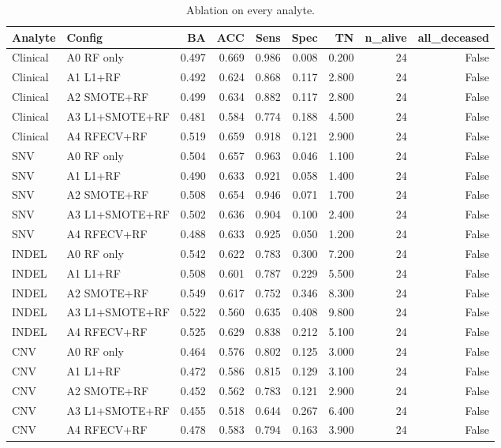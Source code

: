 \begin{table}[t]
\centering
\caption{Ablation on every analyte.}
\begin{tabular}{llrrrrrrr}
\hline
Analyte & Config & BA & ACC & Sens & Spec & TN & n\_alive & all\_deceased \\
\hline
Clinical & A0 RF only & 0.497 & 0.669 & 0.986 & 0.008 & 0.200 & 24 & False \\
Clinical & A1 L1+RF & 0.492 & 0.624 & 0.868 & 0.117 & 2.800 & 24 & False \\
Clinical & A2 SMOTE+RF & 0.499 & 0.634 & 0.882 & 0.117 & 2.800 & 24 & False \\
Clinical & A3 L1+SMOTE+RF & 0.481 & 0.584 & 0.774 & 0.188 & 4.500 & 24 & False \\
Clinical & A4 RFECV+RF & 0.519 & 0.659 & 0.918 & 0.121 & 2.900 & 24 & False \\
SNV & A0 RF only & 0.504 & 0.657 & 0.963 & 0.046 & 1.100 & 24 & False \\
SNV & A1 L1+RF & 0.490 & 0.633 & 0.921 & 0.058 & 1.400 & 24 & False \\
SNV & A2 SMOTE+RF & 0.508 & 0.654 & 0.946 & 0.071 & 1.700 & 24 & False \\
SNV & A3 L1+SMOTE+RF & 0.502 & 0.636 & 0.904 & 0.100 & 2.400 & 24 & False \\
SNV & A4 RFECV+RF & 0.488 & 0.633 & 0.925 & 0.050 & 1.200 & 24 & False \\
INDEL & A0 RF only & 0.542 & 0.622 & 0.783 & 0.300 & 7.200 & 24 & False \\
INDEL & A1 L1+RF & 0.508 & 0.601 & 0.787 & 0.229 & 5.500 & 24 & False \\
INDEL & A2 SMOTE+RF & 0.549 & 0.617 & 0.752 & 0.346 & 8.300 & 24 & False \\
INDEL & A3 L1+SMOTE+RF & 0.522 & 0.560 & 0.635 & 0.408 & 9.800 & 24 & False \\
INDEL & A4 RFECV+RF & 0.525 & 0.629 & 0.838 & 0.212 & 5.100 & 24 & False \\
CNV & A0 RF only & 0.464 & 0.576 & 0.802 & 0.125 & 3.000 & 24 & False \\
CNV & A1 L1+RF & 0.472 & 0.586 & 0.815 & 0.129 & 3.100 & 24 & False \\
CNV & A2 SMOTE+RF & 0.452 & 0.562 & 0.783 & 0.121 & 2.900 & 24 & False \\
CNV & A3 L1+SMOTE+RF & 0.455 & 0.518 & 0.644 & 0.267 & 6.400 & 24 & False \\
CNV & A4 RFECV+RF & 0.478 & 0.583 & 0.794 & 0.163 & 3.900 & 24 & False \\

\end{tabular}
\end{table}
